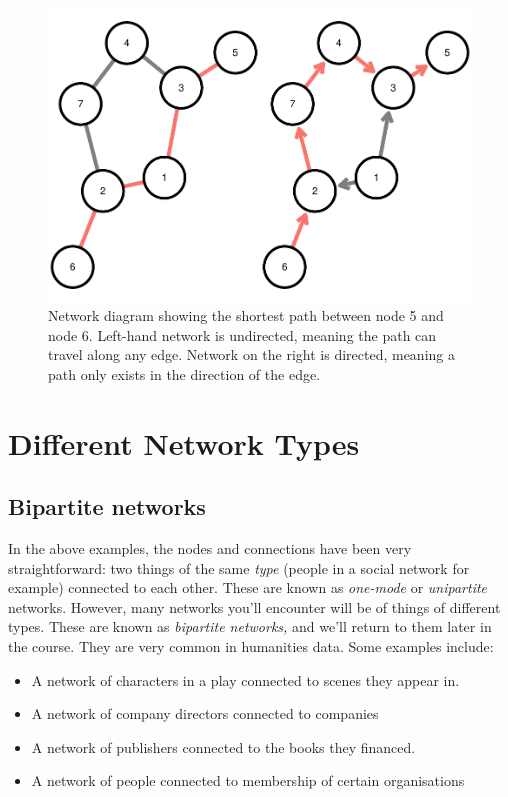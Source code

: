 \documentclass[
]{book}
\begin{document}
\begin{figure}
\centering
\includegraphics{_main_files/figure-latex/unnamed-chunk-1-1.pdf}
\caption{\label{fig:unnamed-chunk-1}Network diagram showing the shortest path between node 5 and node 6. Left-hand network is undirected, meaning the path can travel along any edge. Network on the right is directed, meaning a path only exists in the direction of the edge.}
\end{figure}

\hypertarget{different-network-types}{%
\section{Different Network Types}\label{different-network-types}}

\hypertarget{bipartite-networks}{%
\subsection{Bipartite networks}\label{bipartite-networks}}

In the above examples, the nodes and connections have been very straightforward: two things of the same \emph{type} (people in a social network for example) connected to each other. These are known as \emph{one-mode} or \emph{unipartite} networks. However, many networks you'll encounter will be of things of different types. These are known as \emph{bipartite networks,} and we'll return to them later in the course. They are very common in humanities data. Some examples include:

\begin{itemize}
\item
  A network of characters in a play connected to scenes they appear in.
\item
  A network of company directors connected to companies
\item
  A network of publishers connected to the books they financed.
\item
  A network of people connected to membership of certain organisations
\end{itemize}
\end{document}
